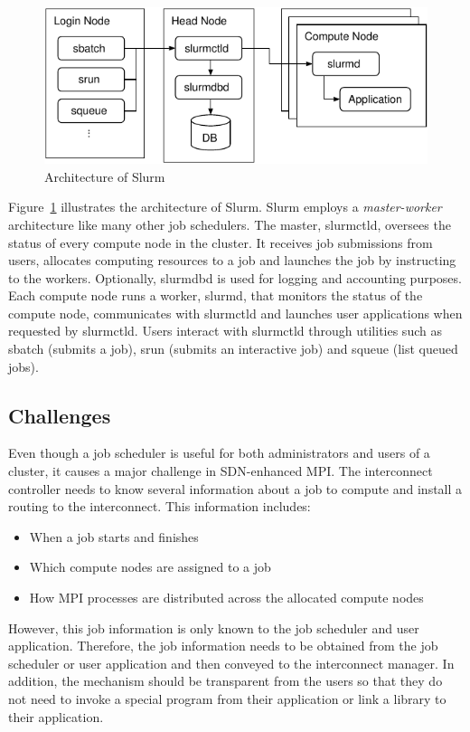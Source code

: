 \documentclass[graybox]{svmult}
\begin{document}
\begin{figure}
    \centering
    \includegraphics{slurm}
    \caption{Architecture of Slurm}%
    \label{kt:fig:slurm}
\end{figure}

Figure~\ref{kt:fig:slurm} illustrates the architecture of Slurm. Slurm employs
a \textit{master-worker} architecture like many other job schedulers. The
master, slurmctld, oversees the status of every compute node in the cluster.
It receives job submissions from users, allocates computing resources to a job
and launches the job by instructing to the workers. Optionally, slurmdbd is
used for logging and accounting purposes. Each compute node runs a worker,
slurmd, that monitors the status of the compute node, communicates with
slurmctld and launches user applications when requested by slurmctld. Users
interact with slurmctld through utilities such as sbatch (submits a job), srun
(submits an interactive job) and squeue (list queued jobs).

\subsection{Challenges}

Even though a job scheduler is useful for both administrators and users of a
cluster, it causes a major challenge in SDN-enhanced MPI\@. The interconnect
controller needs to know several information about a job to compute and
install a routing to the interconnect. This information includes:

\begin{itemize}
    \item When a job starts and finishes
    \item Which compute nodes are assigned to a job
    \item How MPI processes are distributed across the allocated compute nodes
\end{itemize}

However, this job information is only known to the job scheduler and user
application. Therefore, the job information needs to be obtained from the job
scheduler or user application and then conveyed to the interconnect manager.
In addition, the mechanism should be transparent from the users so that they
do not need to invoke a special program from their application or link a
library to their application.
\end{document}
